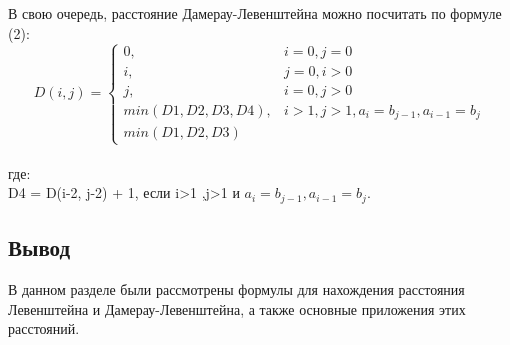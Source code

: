 \documentclass[a4paper,12pt]{report}
\begin{document}
\begin{center}
\begin{flushleft}
		В свою очередь, расстояние Дамерау-Левенштейна можно посчитать по формуле (2):
		\begin{equation}
			D(i,j) = \left\{ \begin{array}{ll}
			0, & \textrm{$i = 0, j = 0$}\\
			i, & \textrm{$j = 0, i > 0$}\\
 			j, & \textrm{$i = 0, j > 0$}\\
			min(D1,D2,D3,D4), & \textrm{$i>1 ,j>1, a_{i} = b_{j-1},a_{i-1}=b_{j}$}\\
			min(D1,D2,D3)
  			\end{array} \right.
		\end{equation}
		\\где:\\
		D4 = D(i-2, j-2) + 1, если i>1 ,j>1 и $a_{i} = b_{j-1},a_{i-1}=b_{j} $.\\
		\end{flushleft}
    \end{center}
    \begin{center}
    \subsection{Вывод}
    \end{center}

    В данном разделе были рассмотрены формулы для нахождения расстояния Левенштейна и Дамерау-Левенштейна, а также основные приложения этих расстояний.
\end{document}
